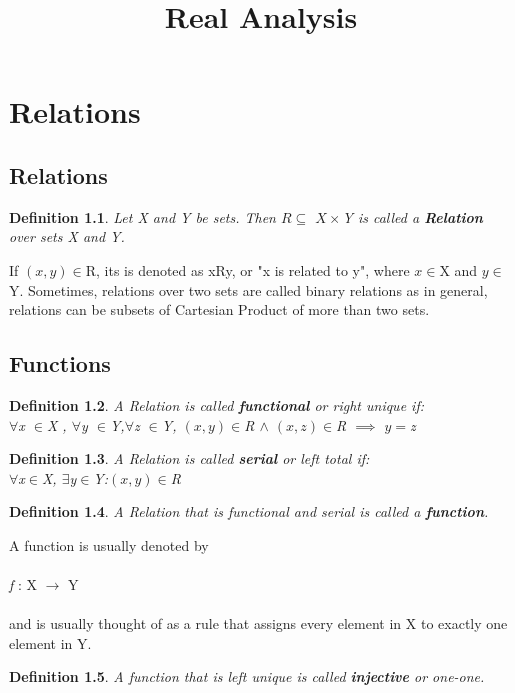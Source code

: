 \documentclass{report}
\begin{document}
\title{Real Analysis}
\newtheorem{theorem}{Theorem}[section]
\newtheorem{definition}{Definition}[section]
\maketitle
\chapter{Relations}
\section{Relations}

\begin{definition}
Let X and Y be sets. Then $R\subseteq$ $X\times$Y is called a \textbf{Relation} over sets X and Y.
\end{definition}
If $(x,y)\in $R, its is denoted as xRy, or "x is related to y", where $x \in $X and $y \in $Y. Sometimes, relations over two sets are called binary relations as in general, relations can be subsets of Cartesian Product of more than two sets.

\section{Functions}
\begin{definition}
A Relation is called \textbf{functional} or right unique if:\\
$\forall $x $\in $X , $\forall $y $\in $Y,$\forall $z $\in $Y, $(x,y)\in $R $\wedge$ $(x,z)\in $R $\implies$ $y=$z
\end{definition}

\begin{definition}
A Relation is called \textbf{serial} or left total if:\\
$\forall $x$\in $X, $\exists $y$\in $Y:$(x,y) \in $R
\end{definition}

\begin{definition}
A Relation that is functional and serial is called a \textbf{function}.
\end{definition}
A function is usually denoted by\\
\\
\emph{f} : X $\rightarrow$ Y\\
\\
and is usually thought of as a rule that assigns every element in X to exactly one element in Y.

\begin{definition}
A function that is left unique is called \textbf{injective} or one-one.
\end{definition}
\end{document}

